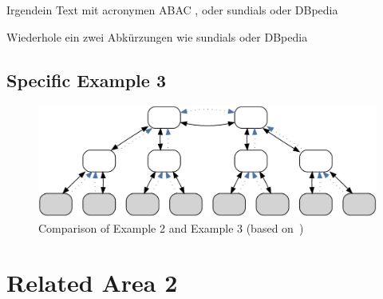 Irgendein Text mit acronymen \ac{ABAC}	\autocite{Auer2007}, oder \ac{sundials} oder \ac{DBpedia} \cite{li2002design,Yuan2005}


Wiederhole ein zwei Abkürzungen wie \ac{sundials} oder \ac{DBpedia}




\subsection{Specific Example 3}


\begin{figure}
    \centering
    \includegraphics[width=.85\textwidth]{resources/images/example3}
    \caption{Comparison of Example 2 and Example 3 (based on~\cite{li2002design})}\label{fig:sota:trans}
\end{figure}










\section{Related Area 2}

